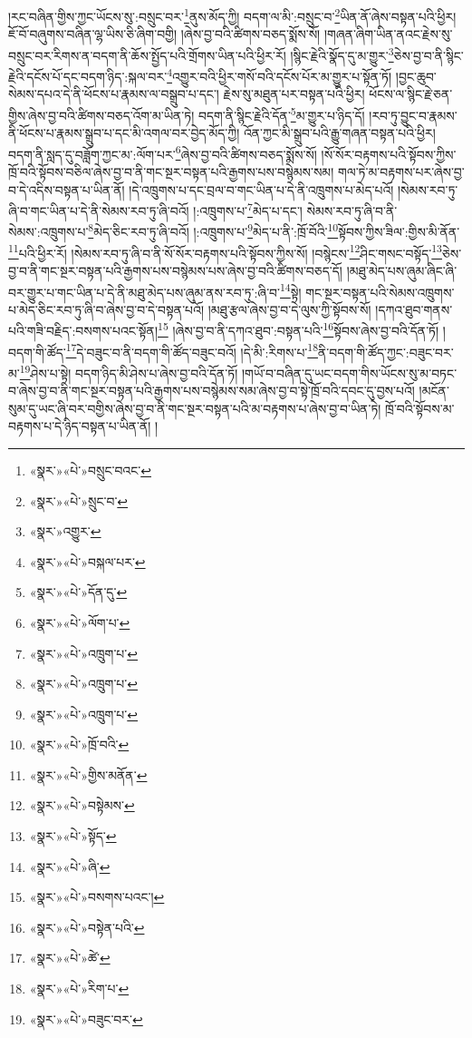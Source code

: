 །རང་བཞིན་གྱིས་ཀྱང་ཡོངས་སུ་:བསྲུང་བར་\footnote{«སྣར་»«པེ་»བསྲུང་བའང་}ནུས་མོད་ཀྱི། བདག་ལ་མི་:བསྲུང་བ་\footnote{«སྣར་»«པེ་»སྲུང་བ་}ཡིན་ནོ་ཞེས་བསྟན་པའི་ཕྱིར། ཇོ་བོ་བཞུགས་བཞིན་ལྷ་ཡིས་ཅི་ཞིག་བགྱི། །ཞེས་བྱ་བའི་ཚིགས་བཅད་སྨོས་སོ། །གཞན་ཞིག་ཡིན་ནའང་རྗེས་སུ་བསྲུང་བར་རིགས་ན་བདག་ནི་ཆོས་སྤྱོད་པའི་གྲོགས་ཡིན་པའི་ཕྱིར་རོ། །སྙིང་རྗེའི་སྣོད་དུ་མ་གྱུར་\footnote{«སྣར་»འགྱུར་}ཅེས་བྱ་བ་ནི་སྙིང་རྗེའི་དངོས་པོ་དང་བདག་ཉིད་:སྐལ་བར་\footnote{«སྣར་»«པེ་»བསྐལ་པར་}འགྱུར་བའི་ཕྱིར་གསོ་བའི་དངོས་པོར་མ་གྱུར་པ་སྟོན་ཏོ། །བྱང་ཆུབ་སེམས་དཔའ་དེ་ནི་ཕོངས་པ་རྣམས་ལ་བསྒྲུབ་པ་དང་། རྗེས་སུ་མཐུན་པར་བསྟན་པའི་ཕྱིར། ཕོངས་ལ་སྙིང་རྗེ་ཅན་གྱིས་ཞེས་བྱ་བའི་ཚིགས་བཅད་འོག་མ་ཡིན་ཏེ། བདག་ནི་སྙིང་རྗེའི་དོན་\footnote{«སྣར་»«པེ་»དོན་དུ་}མ་གྱུར་པ་ཉིད་དོ། །རབ་ཏུ་བྱུང་བ་རྣམས་ནི་ཕོངས་པ་རྣམས་སྒྲུབ་པ་དང་མི་འགལ་བར་བྱེད་མོད་ཀྱི། འོན་ཀྱང་མི་སྒྲུབ་པའི་རྒྱུ་གཞན་བསྟན་པའི་ཕྱིར། བདག་ནི་སླད་དུ་བཟློག་ཀྱང་མ་:ལོག་པར་\footnote{«སྣར་»«པེ་»ལོག་པ་}ཞེས་བྱ་བའི་ཚིགས་བཅད་སྨོས་སོ། །སོ་སོར་བརྟགས་པའི་སྟོབས་ཀྱིས་ཁྲོ་བའི་སྟོབས་བཅིལ་ཞེས་བྱ་བ་ནི་གང་སྔར་བསྟན་པའི་རྒྱགས་པས་བསྙེམས་སམ། གལ་ཏེ་མ་བརྟགས་པར་ཞེས་བྱ་བ་དེ་འདིས་བསྟན་པ་ཡིན་ནོ། །དེ་འཁྲུགས་པ་དང་བྲལ་བ་གང་ཡིན་པ་དེ་ནི་འཁྲུགས་པ་མེད་པའོ། །སེམས་རབ་ཏུ་ཞི་བ་གང་ཡིན་པ་དེ་ནི་སེམས་རབ་ཏུ་ཞི་བའོ། །:འཁྲུགས་པ་\footnote{«སྣར་»«པེ་»འཁྲུག་པ་}མེད་པ་དང་། སེམས་རབ་ཏུ་ཞི་བ་ནི་སེམས་:འཁྲུགས་པ་\footnote{«སྣར་»«པེ་»འཁྲུག་པ་}མེད་ཅིང་རབ་ཏུ་ཞི་བའོ། །:འཁྲུགས་པ་\footnote{«སྣར་»«པེ་»འཁྲུག་པ་}མེད་པ་ནི་:ཁྲོ་བོའི་\footnote{«སྣར་»«པེ་»ཁྲོ་བའི་}སྟོབས་ཀྱིས་ཟིལ་:གྱིས་མི་ནོན་\footnote{«སྣར་»«པེ་»གྱིས་མནོན་}པའི་ཕྱིར་རོ། །སེམས་རབ་ཏུ་ཞི་བ་ནི་སོ་སོར་བརྟགས་པའི་སྟོབས་ཀྱིས་སོ། །བསྙེངས་\footnote{«སྣར་»«པེ་»བསྟེམས་}ཤིང་གསང་བསྟོད་\footnote{«སྣར་»«པེ་»སྟོད་}ཅེས་བྱ་བ་ནི་གང་སྔར་བསྟན་པའི་རྒྱགས་པས་བསྙེམས་པས་ཞེས་བྱ་བའི་ཚིགས་བཅད་དོ། །མཐུ་མེད་པས་ཞུམ་ཞིང་ཞི་བར་གྱུར་པ་གང་ཡིན་པ་དེ་ནི་མཐུ་མེད་པས་ཞུམ་ནས་རབ་ཏུ་:ཞི་བ་\footnote{«སྣར་»«པེ་»ཞི་}སྟེ། གང་སྔར་བསྟན་པའི་སེམས་འཁྲུགས་པ་མེད་ཅིང་རབ་ཏུ་ཞི་བ་ཞེས་བྱ་བ་དེ་བསྟན་པའོ། །མཐུ་རྩལ་ཞེས་བྱ་བ་དེ་ལུས་ཀྱི་སྟོབས་སོ། །དཀའ་ཐུབ་གནས་པའི་གཟི་བརྗིད་:བསགས་པའང་སྟོན།\footnote{«སྣར་»«པེ་»བསགས་པའང་།} །ཞེས་བྱ་བ་ནི་དཀའ་ཐུབ་:བསྟན་པའི་\footnote{«སྣར་»«པེ་»བསྟེན་པའི་}སྟོབས་ཞེས་བྱ་བའི་དོན་ཏོ། །བདག་གི་ཚོད་\footnote{«སྣར་»«པེ་»ཚེ་}དེ་བཟུང་བ་ནི་བདག་གི་ཚོད་བཟུང་བའོ། །དེ་མི་:རིགས་པ་\footnote{«སྣར་»«པེ་»རིག་པ་}ནི་བདག་གི་ཚོད་ཀྱང་:བཟུང་བར་མ་\footnote{«སྣར་»«པེ་»བཟུང་བར་}ཤེས་པ་སྟེ། བདག་ཉིད་མི་ཤེས་པ་ཞེས་བྱ་བའི་དོན་ཏོ། །གཡོ་བ་བཞིན་དུ་ཡང་བདག་གིས་ཡོངས་སུ་མ་བཏང་བ་ཞེས་བྱ་བ་ནི་གང་སྔར་བསྟན་པའི་རྒྱགས་པས་བསྙེམས་སམ་ཞེས་བྱ་བ་སྟེ་ཁྲོ་བའི་དབང་དུ་བྱས་པའོ། །མངོན་སུམ་དུ་ཡང་ཞི་བར་བགྱིས་ཞེས་བྱ་བ་ནི་གང་སྔར་བསྟན་པའི་མ་བརྟགས་པ་ཞེས་བྱ་བ་ཡིན་ཏེ། ཁྲོ་བའི་སྟོབས་མ་བརྟགས་པ་དེ་ཉིད་བསྟན་པ་ཡིན་ནོ། །
